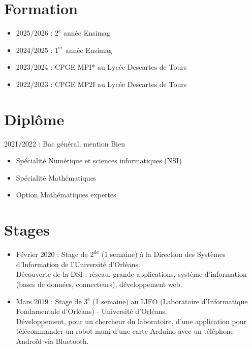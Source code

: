\documentclass[11pt,oneside,a4paper,titlepage]{article}
\begin{document}
\begin{tcolorbox}
\begin{minipage}[t]{11cm}
\begin{tcolorbox}[grow to right by=0.75cm,colframe=white,colback=white]
      \section*{Formation}
      \begin{itemize}
        \item{2025/2026 : $2^e$ année Ensimag}
        \item{2024/2025 : $1^{\text{er}}$ année Ensimag}
        \item{2023/2024 : CPGE MPI* au Lycée Descartes de Tours}
        \item{2022/2023 : CPGE MP2I au Lycée Descartes de Tours}
      \end{itemize}

      \section*{Diplôme}
      2021/2022 : Bac général, mention Bien
      \begin{itemize}
        \item{Spécialité Numérique et sciences informatiques (NSI)}
        \item{Spécialité Mathématiques}
        \item{Option Mathématiques expertes}
      \end{itemize}

      \section*{Stages}
      \begin{itemize}
        \item{Février 2020 : Stage de $2^{\text{de}}$ (1 semaine) à la Direction des Systèmes d'Information de l'Université d'Orléans.\\Découverte de la DSI : réseau, grande applications, système d'information (bases de données, connecteurs), développement web.}
        \item{Mars 2019 : Stage de $3^{\text{e}}$ (1 semaine) au LIFO (Laboratoire d'Informatique Fondamentale d'Orléans) - Université d'Orléans.\\Développement, pour un chercheur du laboratoire, d'une application pour télécommander un robot muni d'une carte Arduino avec un téléphone Androïd via Bluetooth.}
      \end{itemize}
    \end{tcolorbox}
  \end{minipage}
\end{tcolorbox}
\end{document}
